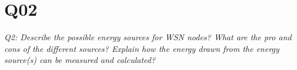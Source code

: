 \chapter{Q02}
\emph{Q2: Describe the possible energy sources for WSN nodes? What are the pro
and cons of the different sources? Explain how the energy drawn from the energy
source(s) can be measured and calculated?}
